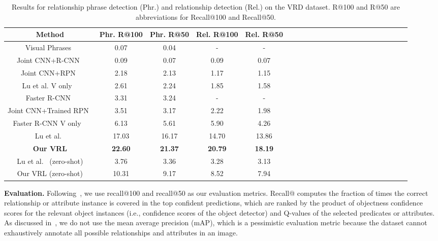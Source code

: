 \documentclass[10pt,twocolumn,letterpaper]{article}
\begin{document}
\begin{table}[!tp]\setlength{\tabcolsep}{2pt}
	\centering\scriptsize
	\caption{Results for relationship phrase detection (Phr.) and relationship detection (Rel.) on the VRD dataset. R@100 and R@50 are abbreviations for Recall@100 and Recall@50.}\label{tab:VRD}
	\vspace{1pt}
	\begin{tabular}{c|c|c|c|cccccccccccccccccc}
		\toprule
		{Method} &  Phr. R@100 & Phr. R@50  &  Rel. R@100 & Rel. R@50  \\
		\midrule			
		Visual Phrases~\cite{sadeghi2011recognition} & 0.07 & 0.04 & - & - \\
		\midrule
		{Joint CNN+R-CNN~\cite{simonyan2014very}} & {0.09} & 0.07 & 0.09 & 0.07  \\
		\midrule
		Joint CNN+RPN~\cite{simonyan2014very} & {2.18} & 2.13 & 1.17 & 1.15  \\
		\midrule
		Lu et al. V only ~\cite{lu2016visual} & {2.61} & 2.24 & 1.85 & 1.58  \\
		\midrule
		Faster R-CNN~\cite{ren2015faster} & {3.31} & 3.24 & - & -  \\	
		\midrule
		Joint CNN+Trained RPN~\cite{ren2015faster} & 3.51 & 3.17 & 2.22 & 1.98  \\
		
		\midrule
		Faster R-CNN V only ~\cite{ren2015faster} & {6.13} & 5.61 & 5.90 & 4.26  \\
		
		\midrule
		Lu et al.~\cite{lu2016visual} & {17.03} & 16.17 & 14.70 & 13.86  \\
		
		\midrule
		\textbf{Our VRL} & \textbf{22.60} & \textbf{21.37} & \textbf{20.79} & \textbf{18.19}  \\
		\hline
		\midrule
		Lu et al.~\cite{lu2016visual} (zero-shot) & {3.76} & 3.36 & 3.28 & 3.13  \\
		\midrule
		{Our VRL} (zero-shot) & {10.31} & {9.17} & {8.52} & {7.94}  \\
		\bottomrule
	\end{tabular}\vspace{-6mm}
\end{table}

\textbf{Evaluation.} Following~\cite{lu2016visual}, we use recall@100 and recall@50 as our evaluation metrics. Recall@ computes the fraction of times the correct relationship or attribute instance is covered in the top  confident predictions, which are ranked by the {product of objectness confidence scores for the relevant} object instances (i.e., confidence scores of the object detector) and Q-values of the selected predicates or attributes. As discussed in~\cite{lu2016visual}, we do not use the mean average precision (mAP), which is a pessimistic evaluation metric because the dataset cannot exhaustively annotate all possible relationships and attributes in an image.
\end{document}

